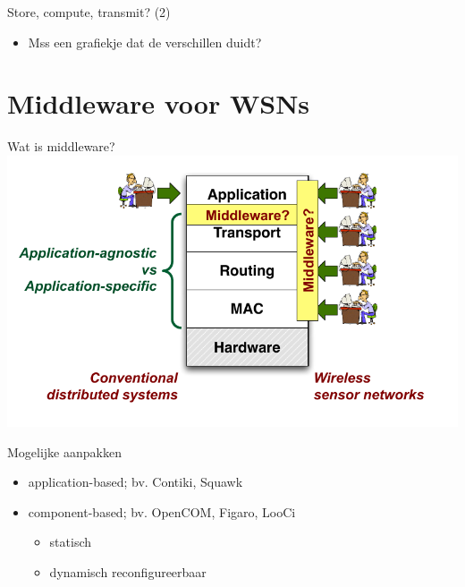\documentclass[presentation, bigger]{beamer}
\begin{document}
\begin{frame}[label=sec-1-8]{Store, compute, transmit? (2)}
\begin{itemize}
\item Mss een grafiekje dat de verschillen duidt?
\end{itemize}
\end{frame}
\section{Middleware voor WSNs}
\label{sec-2}
\begin{frame}[label=sec-2-1]{Wat is middleware?}
\includegraphics[width=\textwidth,keepaspectration=true]{middleware}
\end{frame}

\begin{frame}[label=sec-2-2]{Mogelijke aanpakken}
\begin{itemize}
\item application-based; bv. Contiki, Squawk
\item component-based; bv. OpenCOM, Figaro, LooCi
\begin{itemize}
\item statisch
\item dynamisch reconfigureerbaar
\end{itemize}
\end{itemize}
\end{frame}
\end{document}
